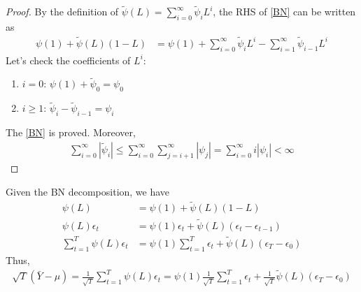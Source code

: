 \documentclass[11pt]{elegantbook}
\begin{document}
\begin{enumerate}
\begin{theorem}[BN Decomposition]
    \end{theorem}
    \begin{proof}
        By the definition of $\tilde{\psi}(L)=\sum_{i=0}^\infty \tilde{\psi}_i L^i$, the RHS of \eqref{BN} can be written as
        \begin{equation}
            \begin{aligned}
                \psi(1)+\tilde{\psi}(L)(1-L)&=\psi(1)+\sum_{i=0}^\infty \tilde{\psi}_i L^i-\sum_{i=1}^\infty \tilde{\psi}_{i-1} L^i
            \end{aligned}
            \nonumber
        \end{equation}
        Let's check the coefficients of $L^i$:
        \begin{enumerate}
            \item $i=0$: $\psi(1)+\tilde{\psi}_0=\psi_0$
            \item $i\geq 1$: $\tilde{\psi}_i-\tilde{\psi}_{i-1}=\psi_{i}$
        \end{enumerate}
        The \eqref{BN} is proved. Moreover,
        \begin{equation}
            \begin{aligned}
                \sum_{i=0}^\infty |\tilde{\psi}_i|\leq \sum_{i=0}^\infty\sum_{j=i+1}^\infty|\psi_j|=\sum_{i=0}^\infty i|\psi_i|<\infty
            \end{aligned}
            \nonumber
        \end{equation}
    \end{proof}
    Given the BN decomposition, we have
    \begin{equation}
        \begin{aligned}
            \psi(L)&=\psi(1)+\tilde{\psi}(L)(1-L)\\
            \psi(L)\epsilon_t&=\psi(1)\epsilon_t+\tilde{\psi}(L)(\epsilon_t-\epsilon_{t-1})\\
            \sum_{t=1}^T\psi(L)\epsilon_t&=\psi(1)\sum_{t=1}^T\epsilon_t+\tilde{\psi}(L)(\epsilon_T-\epsilon_0)
        \end{aligned}
        \nonumber
    \end{equation}
    Thus,
    \begin{equation}
        \begin{aligned}
            \sqrt{T}\left(\bar{Y}-\mu\right)=\frac{1}{\sqrt{T}}\sum_{t=1}^T\psi(L)\epsilon_t=\psi(1)\frac{1}{\sqrt{T}}\sum_{t=1}^T\epsilon_t+\frac{1}{\sqrt{T}}\tilde{\psi}(L)(\epsilon_T-\epsilon_0)
        \end{aligned}

\end{equation}
\end{enumerate}
\end{document}
